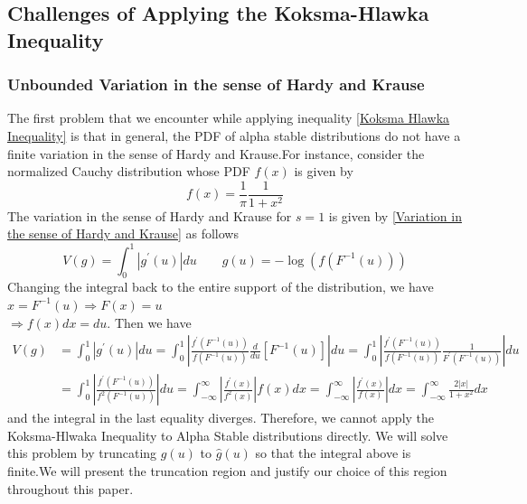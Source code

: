 \documentclass{article}
\theoremstyle{definition}
\begin{document}
\subsection{Challenges of Applying the Koksma-Hlawka Inequality} 
\subsubsection{Unbounded Variation in the sense of Hardy and Krause}
The first problem that we encounter while applying inequality \eqref{Koksma Hlawka Inequality} is that in general, the PDF of alpha stable distributions do not have a finite variation in the sense of Hardy and Krause.For instance, consider the normalized Cauchy  distribution whose PDF $f(x)$ is given by  \begin{equation}
    f(x)=\frac{1}{\pi}\frac{1}{1+x^2}
\end{equation}
The variation in the sense of Hardy and Krause for $s=1$ is given by \eqref{Variation in the sense of Hardy and Krause} as follows \begin{equation}
    V(g)=\int_{0}^1\left\lvert g^{\prime}(u)\right\rvert du \qquad g(u)=-\log\left(f(F^{-1}(u))\right)  
\end{equation}
Changing the integral back to the entire support of the distribution, we have $x=F^{-1}(u)\Rightarrow F(x)=u $\\ $\Rightarrow f(x)dx=du$. Then we have \begin{align*}
    V(g)&=\int_{0}^1\left\lvert g^{\prime}(u)\right\rvert du =\int_0^1\left\lvert \frac{f^{\prime}(F^{-1}(u))}{f(F^{-1}(u))}\frac{d}{du}\left[F^{-1}(u)\right]\right\rvert du=\int_0^1\left\lvert \frac{f^{\prime}(F^{-1}(u))}{f(F^{-1}(u))}\frac{1}{F^{\prime}(F^{-1}(u))}\right\rvert du\\
    &=\int_0^1\left\lvert \frac{f^{\prime}(F^{-1}(u))}{f^2(F^{-1}(u))}\right\rvert du=\int_{-\infty}^{\infty}\left\lvert \frac{f^{\prime}(x)}{f^2(x)}\right\rvert f(x)dx=\int_{-\infty}^{\infty}\left\lvert \frac{f^{\prime}(x)}{f(x)}\right\rvert dx=\int_{-\infty}^{\infty}\frac{2\lvert x\rvert }{1+x^2} dx  
\end{align*}
and the integral in the last equality diverges. Therefore, we cannot apply the Koksma-Hlwaka Inequality to Alpha Stable distributions directly. We will solve this problem by truncating $g(u)$ to $\hat{g}(u)$ so that the integral above is finite.We will present the truncation region and justify our choice of this region throughout this paper. 
\end{document}
